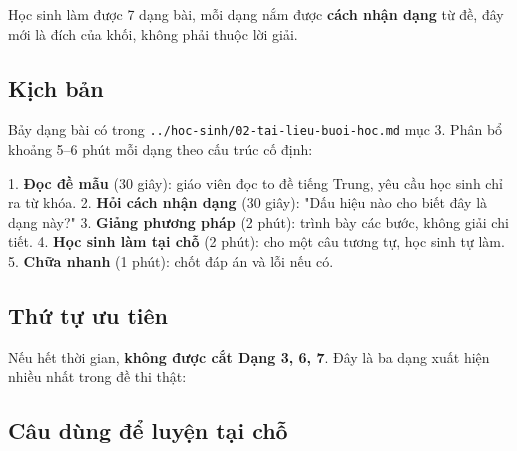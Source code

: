 \documentclass[11pt, a4paper]{article}
\begin{document}
Học sinh làm được 7 dạng bài, mỗi dạng nắm được \textbf{cách nhận dạng} từ đề, đây mới là đích của khối, không phải thuộc lời giải.

\subsection{Kịch bản}

Bảy dạng bài có trong \texttt{../hoc-sinh/02-tai-lieu-buoi-hoc.md} mục 3. Phân bổ khoảng 5–6 phút mỗi dạng theo cấu trúc cố định:

1. \textbf{Đọc đề mẫu} (30 giây): giáo viên đọc to đề tiếng Trung, yêu cầu học sinh chỉ ra từ khóa.
2. \textbf{Hỏi cách nhận dạng} (30 giây): "Dấu hiệu nào cho biết đây là dạng này?"
3. \textbf{Giảng phương pháp} (2 phút): trình bày các bước, không giải chi tiết.
4. \textbf{Học sinh làm tại chỗ} (2 phút): cho một câu tương tự, học sinh tự làm.
5. \textbf{Chữa nhanh} (1 phút): chốt đáp án và lỗi nếu có.

\subsection{Thứ tự ưu tiên}

Nếu hết thời gian, \textbf{không được cắt Dạng 3, 6, 7}. Đây là ba dạng xuất hiện nhiều nhất trong đề thi thật:


\subsection{Câu dùng để luyện tại chỗ}
\end{document}
